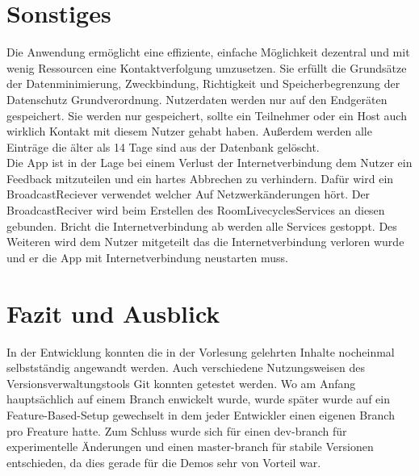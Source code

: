 \section{Sonstiges}
\label{sec:sonstiges}
Die Anwendung ermöglicht eine effiziente, einfache Möglichkeit dezentral und mit wenig Ressourcen eine Kontaktverfolgung umzusetzen.
Sie erfüllt die Grundsätze der Datenminimierung, Zweckbindung, Richtigkeit und Speicherbegrenzung der Datenschutz Grundverordnung. Nutzerdaten werden nur auf den Endgeräten gespeichert. 
Sie werden nur gespeichert, sollte ein Teilnehmer oder ein Host auch wirklich Kontakt mit diesem Nutzer gehabt haben. 
Außerdem werden alle Einträge die älter als 14 Tage sind aus der Datenbank gelöscht.\\
Die App ist in der Lage bei einem Verlust der Internetverbindung dem Nutzer ein Feedback mitzuteilen und ein hartes Abbrechen zu verhindern. 
Dafür wird ein BroadcastReciever verwendet welcher Auf Netzwerkänderungen hört. 
Der BroadcastReciver wird beim Erstellen des RoomLivecyclesServices an diesen gebunden.
 Bricht die Internetverbindung ab werden alle Services gestoppt. 
Des Weiteren wird dem Nutzer mitgeteilt das die Internetverbindung verloren wurde und er die App mit Internetverbindung neustarten muss.

\section{Fazit und Ausblick}
\label{sec:FuA}

In der Entwicklung konnten die in der Vorlesung gelehrten Inhalte nocheinmal selbstständig angewandt werden. 
Auch verschiedene Nutzungsweisen des Versionsverwaltungstools Git konnten getestet werden. 
Wo am Anfang hauptsächlich auf einem Branch enwickelt wurde, wurde später wurde auf ein Feature-Based-Setup gewechselt in dem jeder Entwickler einen eigenen Branch pro Freature hatte.
Zum Schluss wurde sich für einen dev-branch für experimentelle Änderungen und einen master-branch für stabile Versionen entschieden, da dies gerade für die Demos sehr von Vorteil war.

